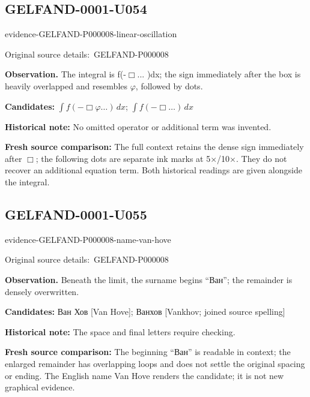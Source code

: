 \documentclass[11pt]{article}
\newcommand{\EvidenceBlock}[4]{%
 \par\smallskip\noindent\begin{minipage}{\linewidth}
 \begin{minipage}[t]{.47\linewidth}\vspace{0pt}\centering
 \csname evidence-#1-#2\endcsname\par
 {\scriptsize\SourceCropCaption\ #1}\par
 \end{minipage}\hfill
 \begin{minipage}[t]{.49\linewidth}\vspace{0pt}\raggedright
 {\small\color{orange!65!black}\textbf{#4} #3}\par
 \end{minipage}
 \end{minipage}\par\smallskip}
\newcommand{\SourceCropCaption}{Original source details:}\newcommand{\ReadingCaption}{Uncertain reading.}\newcommand{\IncompleteCaption}{Undeciphered passage.}\newcommand{\DiagramCaption}{Diagram and typed description.}
\begin{document}
\subsection*{GELFAND-0001-U054}
\EvidenceBlock{GELFAND-P000008}{linear-oscillation}{The integral is f(-\(\Box\)... )dx; the sign immediately after the box is heavily overlapped and resembles \(\varphi\), followed by dots.}{Observation.}
\par\smallskip\noindent\textbf{Candidates: } \(\int f(-\Box\varphi\ldots)\,dx\); \(\int f(-\Box\ldots)\,dx\)\par
\par\smallskip\noindent\textbf{Historical note: } No omitted operator or additional term was invented.\par
\par\smallskip\noindent\textbf{Fresh source comparison: } The full context retains the dense sign immediately after \(\Box\); the following dots are separate ink marks at 5×/10×. They do not recover an additional equation term. Both historical readings are given alongside the integral.\par

\subsection*{GELFAND-0001-U055}
\EvidenceBlock{GELFAND-P000008}{name-van-hove}{Beneath the limit, the surname begins “Ван”; the remainder is densely overwritten.}{Observation.}
\par\smallskip\noindent\textbf{Candidates: } Ван Хов [Van Hove]; Ванхов [Vankhov; joined source spelling]\par
\par\smallskip\noindent\textbf{Historical note: } The space and final letters require checking.\par
\par\smallskip\noindent\textbf{Fresh source comparison: } The beginning “Ван” is readable in context; the enlarged remainder has overlapping loops and does not settle the original spacing or ending. The English name Van Hove renders the candidate; it is not new graphical evidence.\par
\end{document}
